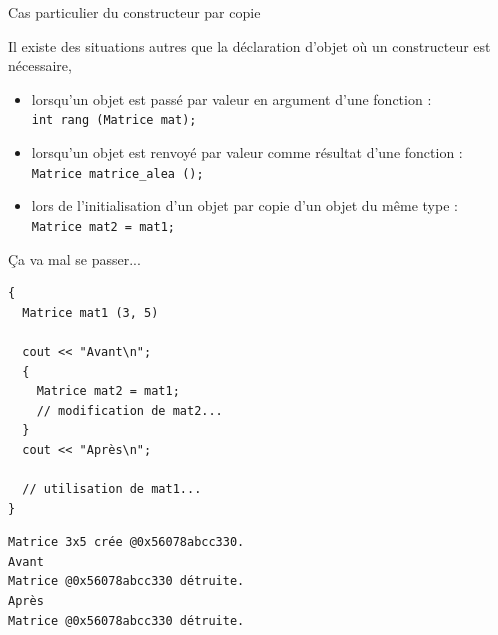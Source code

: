 \documentclass[c]{beamer}
\newcommand{\inline}[1]{\texttt{#1}}
\begin{document}

\begin{frame}[fragile]{Cas particulier du constructeur par copie}

Il existe des situations autres que la déclaration d'objet où un constructeur est nécessaire,

\begin{itemize}[<+->]
\item lorsqu'un objet est passé par valeur en argument d'une fonction : \\ \inline{int rang (Matrice mat);}
\item lorsqu'un objet est renvoyé par valeur comme résultat d'une fonction : \\ \inline{Matrice matrice_alea ();}
\item lors de l'initialisation d'un objet par copie d'un objet du même type : \\ \inline{Matrice mat2 = mat1;}
\end{itemize}

\vspace{1em}

\end{frame}



\begin{frame}[fragile]{Ça va mal se passer...}

\begin{verbatim}
{
  Matrice mat1 (3, 5)

  cout << "Avant\n";
  {
    Matrice mat2 = mat1;
    // modification de mat2...
  }
  cout << "Après\n";

  // utilisation de mat1...
}
\end{verbatim}

\pause

\begin{verbatim}
Matrice 3x5 crée @0x56078abcc330.
Avant
Matrice @0x56078abcc330 détruite.
Après
Matrice @0x56078abcc330 détruite.
\end{verbatim}

\end{frame}

\end{document}
